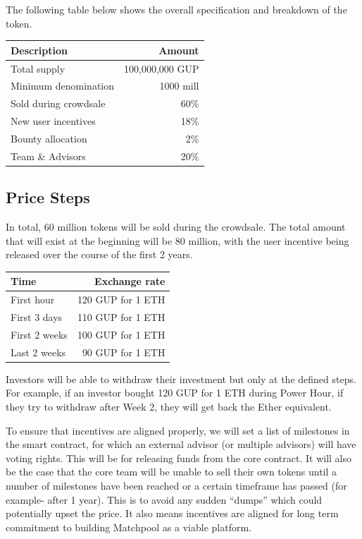 \documentclass[a4paper]{article}
\begin{document}
The following table below shows the overall specification and breakdown of the token.

\begin{table}[!h]
\centering
\begin{tabular}{l|r}
Description & Amount \\\hline
Total supply & 100,000,000 GUP \\
Minimum denomination & 1000 mill \\
Sold during crowdsale & 60\% \\
New user incentives & 18\% \\
Bounty allocation & 2\% \\
Team \& Advisors & 20\% 

\end{tabular}
\end{table}

\subsection{Price Steps}

In total, 60 million tokens will be sold during the crowdsale. The total amount that will exist at the beginning will be 80 million, with the user incentive being released over the course of the first 2 years.

\begin{table}[!h]
\centering
\begin{tabular}{l|r}
Time & Exchange rate \\\hline
First hour & 120 GUP for 1 ETH \\
First 3 days & 110 GUP for 1 ETH \\
First 2 weeks & 100 GUP for 1 ETH \\
Last 2 weeks & 90 GUP for 1 ETH 
\end{tabular}
\end{table}

Investors will be able to withdraw their investment but only at the defined steps. For example, if an investor bought 120 GUP for 1 ETH during Power Hour, if they try to withdraw after Week 2, they will get back the Ether equivalent.

To ensure that incentives are aligned properly, we will set a list of milestones in the smart contract, for which an external advisor (or multiple advisors) will have voting rights. This will be for releasing funds from the core contract. It will also be the case that the core team will be unable to sell their own tokens until a number of milestones have been reached or a certain timeframe has passed (for example- after 1 year). This is to avoid any sudden “dumps” which could potentially upset the price. It also means incentives are aligned for long term commitment to building Matchpool as a viable platform.
\end{document}
